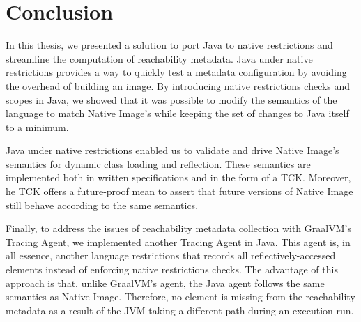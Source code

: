 \chapter{Conclusion}
% 

In this thesis, we presented a solution to port Java to native restrictions and streamline the computation of reachability metadata. 
Java under native restrictions provides a way to quickly test a metadata configuration by avoiding the overhead of building an image.
By introducing native restrictions checks and scopes in Java, we showed that it was possible to modify the semantics of the language to match Native Image's while keeping the set of changes to Java itself to a minimum.

Java under native restrictions enabled us to validate and drive Native Image's semantics for dynamic class loading and reflection. These semantics are implemented both in written specifications and in the form of a TCK. Moreover, he TCK offers a future-proof mean to assert that future versions of Native Image still behave according to the same semantics. 

Finally, to address the issues of reachability metadata collection with GraalVM's Tracing Agent, we implemented another Tracing Agent in Java. This agent is, in all essence, another language restrictions that records all reflectively-accessed elements instead of enforcing native restrictions checks. The advantage of this approach is that, unlike GraalVM's agent, the Java agent follows the same semantics as Native Image. Therefore, no element is missing from the reachability metadata as a result of the JVM taking a different path during an execution run. 


% 
